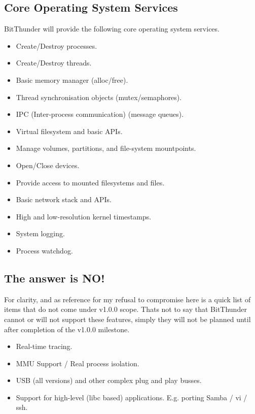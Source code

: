 \subsection{Core Operating System Services}
BitThunder will provide the following core operating system services.

\begin{itemize}
\item Create/Destroy processes.
\item Create/Destroy threads.
\item Basic memory manager (alloc/free).
\item Thread synchronisation objects (mutex/semaphores).
\item IPC (Inter-process communication) (message queues).
\item Virtual filesystem and basic APIs.
\item Manage volumes, partitions, and file-system mountpoints.
\item Open/Close devices.
\item Provide access to mounted filesystems and files.
\item Basic network stack and APIs.
\item High and low-resolution kernel timestamps.
\item System logging.
\item Process watchdog.
\end{itemize}

\subsection{The answer is NO!}
For clarity, and as reference for my refusal to compromise here is a quick list of items
that do not come under v1.0.0 scope. Thats not to say that BitThunder cannot or will not
support these features, simply they will not be planned until after completion of the 
v1.0.0 milestone.

\begin{itemize}
\item Real-time tracing.
\item MMU Support / Real process isolation.
\item USB (all versions) and other complex plug and play busses.
\item Support for high-level (libc based) applications. E.g. porting Samba / vi / ssh.
\end{itemize}
